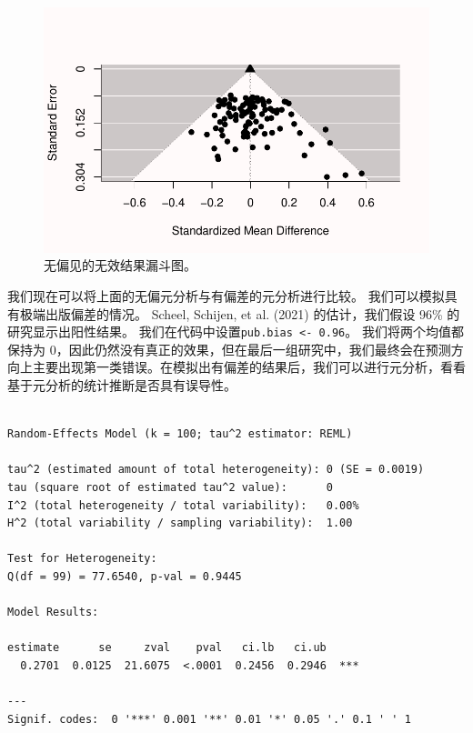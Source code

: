 \documentclass[
  letterpaper,
  DIV=11,
  numbers=noendperiod]{scrreprt}
\begin{document}
\begin{figure}

{\centering \includegraphics[width=1\textwidth,height=\textheight]{12-bias_files/figure-pdf/fig-funnel1-1.pdf}

}

\caption{\label{fig-funnel1}无偏见的无效结果漏斗图。}

\end{figure}

我们现在可以将上面的无偏元分析与有偏差的元分析进行比较。
我们可以模拟具有极端出版偏差的情况。 Scheel, Schijen, et al. (2021)
的估计，我们假设 96\% 的研究显示出阳性结果。
我们在代码中设置\texttt{pub.bias\ \textless{}-\ 0.96}。
我们将两个均值都保持为
0，因此仍然没有真正的效果，但在最后一组研究中，我们最终会在预测方向上主要出现第一类错误。在模拟出有偏差的结果后，我们可以进行元分析，看看基于元分析的统计推断是否具有误导性。

\begin{verbatim}

Random-Effects Model (k = 100; tau^2 estimator: REML)

tau^2 (estimated amount of total heterogeneity): 0 (SE = 0.0019)
tau (square root of estimated tau^2 value):      0
I^2 (total heterogeneity / total variability):   0.00%
H^2 (total variability / sampling variability):  1.00

Test for Heterogeneity:
Q(df = 99) = 77.6540, p-val = 0.9445

Model Results:

estimate      se     zval    pval   ci.lb   ci.ub      
  0.2701  0.0125  21.6075  <.0001  0.2456  0.2946  *** 

---
Signif. codes:  0 '***' 0.001 '**' 0.01 '*' 0.05 '.' 0.1 ' ' 1
\end{verbatim}
\end{document}

